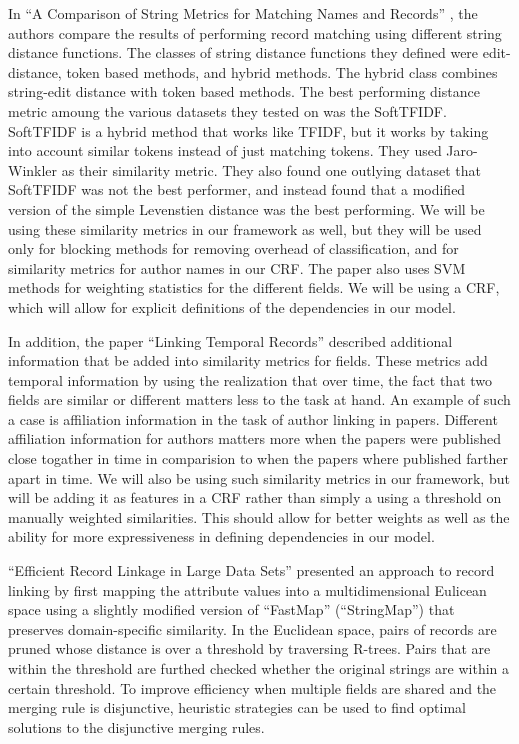 \documentclass[]{article}
\begin{document}
In ``A Comparison of String Metrics for Matching Names and Records'' \cite{cohen2003comparison}, the authors compare the results of performing record matching using different string distance functions. The classes of string distance functions they defined were edit-distance, token based methods, and hybrid methods. The hybrid class combines string-edit distance with token based methods. The best performing distance metric amoung the various datasets they tested on was the SoftTFIDF. SoftTFIDF is a hybrid method that works like TFIDF, but it works by taking into account similar tokens instead of just matching tokens. They used Jaro-Winkler as their similarity metric. They also found one outlying dataset that SoftTFIDF was not the best performer, and instead found that a modified version of the simple Levenstien distance was the best performing. We will be using these similarity metrics in our framework as well, but they will be used only for blocking methods for removing overhead of classification, and for similarity metrics for author names in our CRF. The paper also uses SVM methods for weighting statistics for the different fields. We will be using a CRF, which will allow for explicit definitions of the dependencies in our model.

In addition, the paper ``Linking Temporal Records'' \cite{DBLP:journals/fcsc/LiDMS12} described additional information that be added into similarity metrics for fields. These metrics add temporal information by using the realization that over time, the fact that two fields are similar or different matters less to the task at hand. An example of such a case is affiliation information in the task of author linking in papers. Different affiliation information for authors matters more when the papers were published close togather in time in comparision to when the papers where published farther apart in time. We will also be using such similarity metrics in our framework, but will be adding it as features in a CRF rather than simply a using a threshold on manually weighted similarities. This should allow for better weights as well as the ability for more expressiveness in defining dependencies in our model.

``Efficient Record Linkage in Large Data Sets'' presented an approach to record linking by first mapping the attribute values into a multidimensional Eulicean space using a slightly modified version of ``FastMap'' (``StringMap'') that preserves domain-specific similarity.  In the Euclidean space, pairs of records are pruned whose distance is over a threshold by traversing R-trees.  Pairs that are within the threshold are furthed checked whether the original strings are within a certain threshold.  To improve efficiency when multiple fields are shared and the merging rule is disjunctive, heuristic strategies can be used to find optimal solutions to the disjunctive merging rules.
\end{document}
